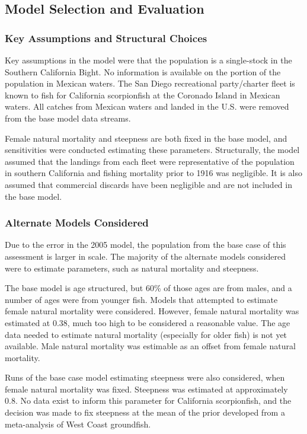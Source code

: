 \documentclass[12pt,]{article}
\begin{document}
\subsection{Model Selection and
Evaluation}\label{model-selection-and-evaluation}

\subsubsection{Key Assumptions and Structural
Choices}\label{key-assumptions-and-structural-choices}

Key assumptions in the model were that the population is a single-stock
in the Southern California Bight. No information is available on the
portion of the population in Mexican waters. The San Diego recreational
party/charter fleet is known to fish for California scorpionfish at the
Coronado Island in Mexican waters. All catches from Mexican waters and
landed in the U.S. were removed from the base model data streams.

Female natural mortality and steepness are both fixed in the base model,
and sensitivities were conducted estimating these parameters.
Structurally, the model assumed that the landings from each fleet were
representative of the population in southern California and fishing
mortality prior to 1916 was negligible. It is also assumed that
commercial discards have been negligible and are not included in the
base model.

\subsubsection{Alternate Models
Considered}\label{alternate-models-considered}

Due to the error in the 2005 model, the population from the base case of
this assessment is larger in scale. The majority of the alternate models
considered were to estimate parameters, such as natural mortality and
steepness.

The base model is age structured, but 60\% of those ages are from males,
and a number of ages were from younger fish. Models that attempted to
estimate female natural mortality were considered. However, female
natural mortality was estimated at 0.38, much too high to be considered
a reasonable value. The age data needed to estimate natural mortality
(especially for older fish) is not yet available. Male natural mortality
was estimable as an offset from female natural mortality.

Runs of the base case model estimating steepness were also considered,
when female natural mortality was fixed. Steepness was estimated at
approximately 0.8. No data exist to inform this parameter for California
scorpionfish, and the decision was made to fix steepness at the mean of
the prior developed from a meta-analysis of West Coast groundfish.
\end{document}
